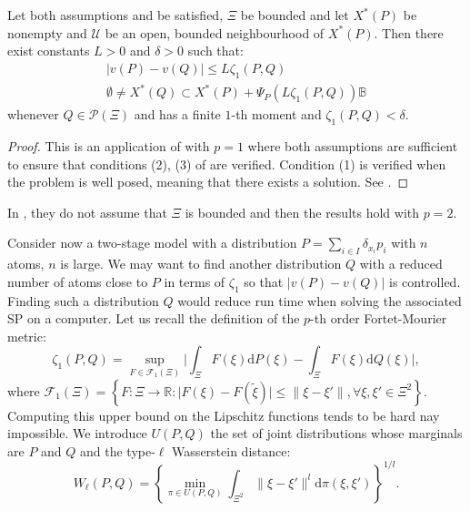 \documentclass{amsart}
\newcommand{\RR}{\mathbb{R}}
\begin{document}
\begin{corollary}
    Let both assumptions  and  be satisfied, $\Xi$ be bounded and let $X^*\left(P\right)$ be nonempty and $\mathcal{U}$ be an open, bounded neighbourhood of $X^*\left(P\right).$ Then there exist constants $L>0$ and $\delta >0$ such that:
    \begin{align*}
        \lvert v\left(P\right)-v\left(Q\right)\rvert \leq L\zeta_1\left(P,Q\right) \\
        \emptyset \ne X^*\left(Q\right)\subset X^*\left(P\right)+\Psi_P\left(L\zeta_1\left(P,Q\right)\right)\mathbb{B}
    \end{align*}
    whenever $Q\in\mathcal{P}\left(\Xi\right)$ and has a finite $1$-th moment and $\zeta_1\left(P,Q\right)<\delta$.
\end{corollary}
\begin{proof}
    This is an application of  with $p=1$ where both assumptions are sufficient to ensure that conditions (2), (3) of  are verified. Condition (1) is verified when the problem is well posed, meaning that there exists a solution. See \cite[Proposition 22]{romisch_stability_2003}.
\end{proof}
\begin{remark}
    In \cite{romisch_stability_2003}, they do not assume that $\Xi$ is bounded and then the results hold with $p=2$.
\end{remark}
Consider now a two-stage model with a distribution $P=\sum_{i\in I}\delta_{x_i}p_i$ with $n$ atoms, $n$ is large. We may want to find another distribution $Q$ with a reduced number of atoms close to $P$ in terms of $\zeta_1$ so that $\lvert v\left(P\right)-v\left(Q\right)\rvert$ is controlled. Finding such a distribution $Q$ would reduce run time when solving the associated SP on a computer. Let us recall the definition of the $p$-th order Fortet-Mourier metric:
$$
\zeta_1\left(P,Q\right)=\sup_{F\in\mathcal{F}_1\left(\Xi\right)}\lvert \int_\Xi F\left(\xi\right)\text{d}P\left(\xi\right)-\int_\Xi F\left(\xi\right)\text{d}Q\left(\xi\right)\rvert,
$$
where $\mathcal{F}_1\left(\Xi\right)=\left\{F:\Xi\to \RR: \lvert F\left(\xi\right)-F\left(\tilde{\xi}\right)\rvert \leq \lVert\xi-\xi'\rVert, \forall \xi,\xi'\in \Xi^2 \right\}$. Computing this upper bound on the Lipschitz functions tends to be hard nay impossible. We introduce $U\left(P,Q\right)$ the set of joint distributions whose marginals are $P$ and $Q$ and the type-$\ell$ Wasserstein distance: $$
W_\ell\left(P,Q\right) = \left\{\min_{\pi\in U\left(P,Q\right)}\int_{\Xi^2}\lVert \xi-\xi'\rVert^l \text{d}\pi\left(\xi,\xi'\right)\right\}^{1/l}.$$
\end{document}
